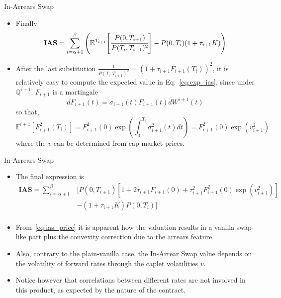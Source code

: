 \documentclass{beamer}
\begin{document}
\begin{frame}{In-Arrears Swap}
\begin{itemize}
\item Finally
\begin{equation}
\textbf{IAS}=\sum_{i=\alpha+1}^{\beta}\Bigg(\mathbb{E}^{T_{i+1}}\Bigg[\cfrac{P(0,T_{i+1})}{P(T_i,T_{i+1})^2}\Bigg]-P(0,T_i)(1+\tau_{i+1}K)\Bigg)
\label{eq:exp_ias}
\end{equation}
\item After the last substitution $\frac{1}{P(T_i,T_{i+1})^2}=(1+\tau_{i+1}F_{i+1}(T_i))^2$, it is relatively easy to compute the expected value in Eq.~\ref{eq:exp_ias}, since under $\mathbb{Q}^{i+1}$, $F_{i+1}$ is a martingale
\begin{equation*}
dF_{i+1}(t) = \sigma_{i+1}(t)F_{i+1}(t)dW^{i+1}(t)
\end{equation*}
so that, 
\begin{equation*}
\mathbb{E}^{i+1}[F_{i+1}^2(T_i)]=F_{i+1}^2(0)\exp\left(\int_0^{T_i}\sigma_{i+1}^2(t)dt\right) = F_{i+1}^2(0)\exp(v_{i+1}^2)
\end{equation*}
where the $v$ can be determined from cap market prices.
\end{itemize}
\end{frame}

\begin{frame}{In-Arrears Swap}
\begin{itemize}
\item The final expression is
\begin{equation}
\begin{aligned}
\textbf{IAS} = \sum_{i=\alpha+1}^{\beta}&[
P(0,T_{i+1}) [1+2\tau_{i+1}F_{i+1}(0) + \tau_{i+1}^2 F_{i+1}^2(0)\exp(v_{i+1}^2)]\\
&-(1+\tau_{i+1}K)P(0,T_i)] \\
\end{aligned}
\label{eq:ias_price}
\end{equation}
\item  From~\cref{eq:ias_price} it is apparent how the valuation results in a vanilla swap-like part plus the convexity correction due to the arrears feature.
\item Also, contrary to the plain-vanilla case, the In-Arrear Swap value depends on the volatility of forward rates through the caplet volatilities $v$. 
\item Notice however that correlations between different rates are not involved in this product, as expected by the nature of the contract.

\end{itemize}
\end{frame}
\end{document}
